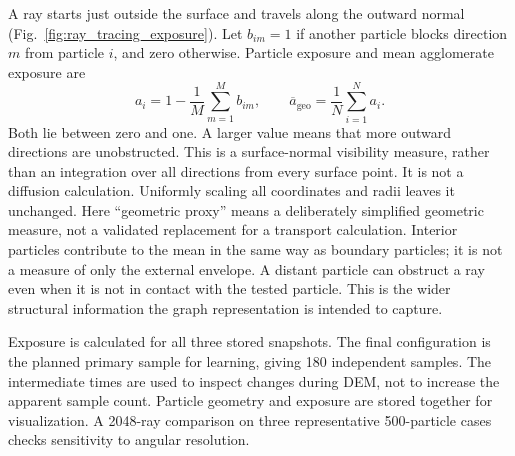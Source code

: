 \documentclass[11pt,a4paper]{article}
\begin{document}
A ray starts just outside the surface and travels along the outward normal (Fig.~\ref{fig:ray_tracing_exposure}). Let $b_{im}=1$ if another particle blocks direction $m$ from particle $i$, and zero otherwise. Particle exposure and mean agglomerate exposure are
\begin{equation}
 a_i=1-\frac{1}{M}\sum_{m=1}^{M}b_{im},\qquad
 \overline a_{\mathrm{geo}}=\frac{1}{N}\sum_{i=1}^{N}a_i.
\end{equation}
Both lie between zero and one. A larger value means that more outward directions are unobstructed. This is a surface-normal visibility measure, rather than an integration over all directions from every surface point. It is not a diffusion calculation. Uniformly scaling all coordinates and radii leaves it unchanged. Here ``geometric proxy'' means a deliberately simplified geometric measure, not a validated replacement for a transport calculation. Interior particles contribute to the mean in the same way as boundary particles; it is not a measure of only the external envelope. A distant particle can obstruct a ray even when it is not in contact with the tested particle. This is the wider structural information the graph representation is intended to capture.


Exposure is calculated for all three stored snapshots. The final configuration is the planned primary sample for learning, giving 180 independent samples. The intermediate times are used to inspect changes during DEM, not to increase the apparent sample count. Particle geometry and exposure are stored together for visualization. A 2048-ray comparison on three representative 500-particle cases checks sensitivity to angular resolution.
\end{document}
